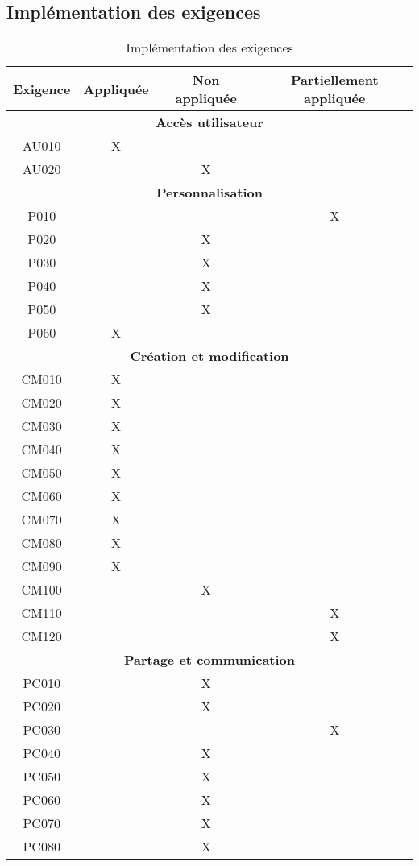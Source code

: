 \documentclass{article}
\begin{document}
\subsection{Implémentation des exigences}
\begin{table}[h]
\large
\centering
\begin{tabular}{|c|c|c|c|}
\hline
Exigence & Appliquée  & Non appliquée & Partiellement appliquée \\
\hline
\multicolumn{4}{|c|}{\textbf{Accès utilisateur}} \\
AU010 & X & &  \\
AU020 &  & X & \\
\hline
\multicolumn{4}{|c|}{\textbf{Personnalisation}} \\
P010 & & & X \\
P020 & & X & \\
P030 & & X & \\
P040 & & X & \\
P050 & & X & \\
P060 & X & & \\
\hline
\multicolumn{4}{|c|}{\textbf{ Création et modification}} \\
CM010 & X & & \\
CM020 & X & & \\
CM030 & X & & \\
CM040 & X & & \\
CM050 & X & & \\
CM060 & X & & \\
CM070 & X & & \\
CM080 & X & & \\
CM090 & X & & \\
CM100 & & X & \\
CM110 & & & X \\
CM120 & & & X \\
\hline
\multicolumn{4}{|c|}{\textbf{Partage et communication}} \\
PC010 & & X & \\
PC020 & & X & \\
PC030 & & & X \\
PC040 & & X & \\
PC050 & & X & \\
PC060 & & X & \\
PC070 & & X & \\
PC080 & & X & \\
\hline
\end{tabular}
\caption{Implémentation des exigences}
\label{tab:exemple}
\end{table}
\end{document}
